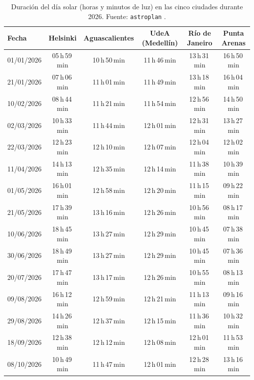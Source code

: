\begin{table}[H]
  \centering
  \caption{Duración del día solar (horas y minutos de luz) en las cinco ciudades durante
           2026.
           Fuente: \texttt{astroplan} \citep{Morris2018}.}
  \label{tab:duracion}
  {\scriptsize
  \begin{tabular}{lccccc}
    \toprule
    \textbf{Fecha} &
    \textbf{Helsinki} &
    \textbf{Aguascalientes} &
    \textbf{UdeA (Medellín)} &
    \textbf{Río de Janeiro} &
    \textbf{Punta Arenas} \\
    \midrule
    01/01/2026 & 05\,h\,59\,min & 10\,h\,50\,min & 11\,h\,46\,min & 13\,h\,31\,min & 16\,h\,50\,min \\
    21/01/2026 & 07\,h\,06\,min & 11\,h\,01\,min & 11\,h\,49\,min & 13\,h\,18\,min & 16\,h\,04\,min \\
    10/02/2026 & 08\,h\,44\,min & 11\,h\,21\,min & 11\,h\,54\,min & 12\,h\,56\,min & 14\,h\,50\,min \\
    02/03/2026 & 10\,h\,33\,min & 11\,h\,44\,min & 12\,h\,01\,min & 12\,h\,31\,min & 13\,h\,27\,min \\
    22/03/2026 & 12\,h\,23\,min & 12\,h\,10\,min & 12\,h\,07\,min & 12\,h\,04\,min & 12\,h\,02\,min \\
    11/04/2026 & 14\,h\,13\,min & 12\,h\,35\,min & 12\,h\,14\,min & 11\,h\,38\,min & 10\,h\,39\,min \\
    01/05/2026 & 16\,h\,01\,min & 12\,h\,58\,min & 12\,h\,20\,min & 11\,h\,15\,min & 09\,h\,22\,min \\
    21/05/2026 & 17\,h\,39\,min & 13\,h\,16\,min & 12\,h\,26\,min & 10\,h\,56\,min & 08\,h\,17\,min \\
    10/06/2026 & 18\,h\,45\,min & 13\,h\,27\,min & 12\,h\,29\,min & 10\,h\,45\,min & 07\,h\,38\,min \\
    30/06/2026 & 18\,h\,49\,min & 13\,h\,27\,min & 12\,h\,29\,min & 10\,h\,45\,min & 07\,h\,36\,min \\
    20/07/2026 & 17\,h\,47\,min & 13\,h\,17\,min & 12\,h\,26\,min & 10\,h\,55\,min & 08\,h\,13\,min \\
    09/08/2026 & 16\,h\,12\,min & 12\,h\,59\,min & 12\,h\,21\,min & 11\,h\,13\,min & 09\,h\,16\,min \\
    29/08/2026 & 14\,h\,26\,min & 12\,h\,37\,min & 12\,h\,15\,min & 11\,h\,36\,min & 10\,h\,32\,min \\
    18/09/2026 & 12\,h\,38\,min & 12\,h\,12\,min & 12\,h\,08\,min & 12\,h\,01\,min & 11\,h\,53\,min \\
    08/10/2026 & 10\,h\,49\,min & 11\,h\,47\,min & 12\,h\,01\,min & 12\,h\,28\,min & 13\,h\,16\,min \\

\end{tabular}}
\end{table}
